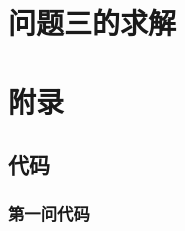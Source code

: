 \documentclass[UTF8]{ctexart}
\begin{document}
\section{问题三的求解}


\clearpage

\clearpage

\section{附录}
\subsection{代码}
\subsubsection{第一问代码}
\lstset{language=python}
\end{document}
